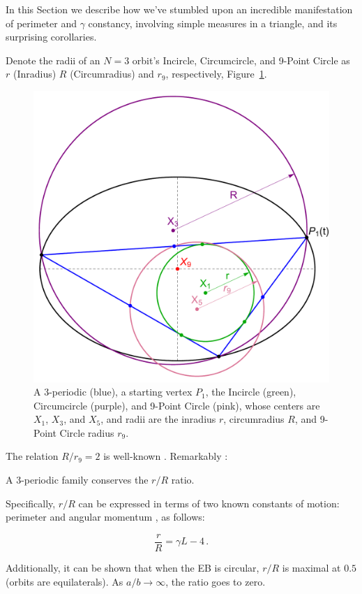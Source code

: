 In this Section we describe how we've stumbled upon an incredible manifestation of perimeter and $\gamma$ constancy, involving simple measures in a triangle, and its surprising corollaries.

Denote the radii of an $N=3$ orbit's Incircle, Circumcircle, and 9-Point Circle \cite{mw} as $r$ (Inradius) $R$ (Circumradius) and $r_9$, respectively,  Figure~\ref{fig:radii}.

\begin{figure}[H]
    \centering
    \includegraphics[width=.65\textwidth]{pics/u0070_Radii.pdf}
    \caption{A 3-periodic (blue), a starting vertex $P_1$, the Incircle (green), Circumcircle (purple), and 9-Point Circle (pink), whose centers are $X_1$, $X_3$, and $X_5$, and radii are the inradius $r$, circumradius $R$, and 9-Point Circle radius $r_9$.}
    \label{fig:radii}
\end{figure}

\noindent The relation $R/r_9=2$ is well-known \cite{mw}. Remarkably \cite{ronaldo19a}:

\begin{theorem}
A 3-periodic family conserves the $r/R$ ratio. 
\label{thm:rovR}
\end{theorem}

Specifically, $r/R$ can be expressed in terms of two known constants of motion: perimeter and angular momentum \cite{dominique19,sergei19_private_circles}, as follows:

\begin{equation}
\frac{r}{R}=%
\gamma L - 4\, .
\label{eqn:rR_dominique}
\end{equation}

Additionally, it can be shown that when the EB is circular, $r/R$ is maximal at $0.5$ (orbits are equilaterals). As $a/b\rightarrow\infty$, the ratio goes to zero.

